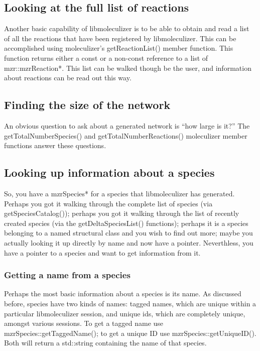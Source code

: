 \subsection{Looking at the full list of reactions}
Another basic capability of libmoleculizer is to be able to obtain and
read a list of all the reactions that have been registered by
libmoleculizer.  This can be accomplished using moleculizer's
getReactionList() member function.  This function returns either a
const or a non-const reference to a list of mzr::mzrReaction*.  This
list can be walked though be the user, and information about reactions
can be read out this way.

\subsection{Finding the size of the network}
An obvious question to ask about a generated network is ``how large is
it?''  The getTotalNumberSpecies() and getTotalNumberReactions()
moleculizer member functions answer these questions.  

\subsection{Looking up information about a species}
So, you have a mzrSpecies* for a species that libmoleculizer has
generated. Perhaps you got it walking through the complete list of
species (via getSpeciesCatalog()); perhaps you got it walking through
the list of recently created species (via the getDeltaSpeciesList()
functions); perhaps it is a species belonging to a named structural
class and you wish to find out more; maybe you actually looking it up
directly by name and now have a pointer.  Neverthless, you have a
pointer to a species and want to get information from it.

\subsubsection{Getting a name from a species}

Perhaps the most basic information about a species is its name.  As
discussed before, species have two kinds of names: tagged names, which
are unique within a particular libmoleculizer session, and unique ids,
which are completely unique, amongst various sessions.  To get a
tagged name use mzrSpecies::getTaggedName(); to get a unique ID use
mzrSpecies::getUniqueID().  Both will return a std::string containing
the name of that species.  

